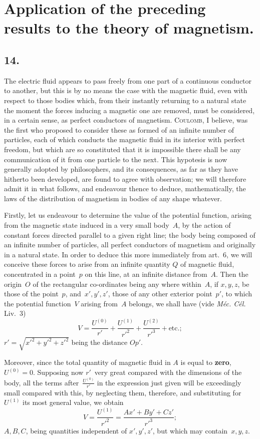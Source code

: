 \documentclass[11pt,notitlepage]{amsart}
\let\Person\textsc
\let\Emphasis\textbf
\let\Title\textit
\newcommand\Section[1]{\subsection{{#1}}}
\begin{document}
\section{Application of the preceding results to the theory of magnetism.}
\Section{14.}
The electric fluid appears to pass freely from one part of a continuous
conductor to another, but this is by no means the case with the magnetic
fluid, even with respect to those bodies which, from their instantly returning
to a natural state the moment the forces inducing a magnetic one are removed,
must be considered, in a certain sense, as perfect conductors of magnetism.
\Person{Coulomb}, I believe,
was the first who proposed to consider these as formed
of an infinite number of particles, each of which conducts the magnetic fluid
in its interior with perfect freedom, but which are so constituted that it is
impossible there shall be any communication of it from one particle to the
next. This hypotesis is now generally adopted by philosophers, and its 
consequences, as far as they have hitherto been developed, are found to agree
with observation; we will therefore admit it in what follows, and endeavour
thence to deduce, mathematically, the laws of the distribution of magnetism
in bodies of any shape whatever.

Firstly, let us endeavour to determine the value of the potential
function, arising from the magnetic state induced in a very small body~$A$, by
the action of constant forces directed parallel to a given right line; the body
being composed of an infinite number of particles, all perfect conductors of
magnetism and originally in a natural state. In order to deduce this more
immediately from art.~6, we will conceive these forces to arise from an 
infinite quantity $Q$ of magnetic fluid, concentrated
in a point~$p$ on this line, at
an infinite distance from~$A$. Then the origin~$O$ of the rectangular
co-ordinates being any where within~$A$, if $x,y,z$,
be those of the point~$p$, and~$x',y',z'$,
those of any other exterior point~$p'$, to which the potential
function~$V$ arising from~$A$ belongs, we shall have
(vide \Title{M\'ec. C\'el.} Liv.~3)
\[
V=\frac{U^{(0)}}{r'}
+\frac{U^{(1)}}{r'^2}
+\frac{U^{(2)}}{r'^3}
+\text{etc.};
\]
$r'=\sqrt{x'^2+y'^2+z'^2}$ being the distance $Op'$.

Moreover, since the total quantity of magnetic fluid in $A$ is equal to
\Emphasis{zero}, ${U^{(0)}=0}$.
Supposing now $r'$~very great compared with the dimensions of
the body, all the terms after~$\frac{U^{(0)}}{r'}$
in the expression just given will be exceedingly
small compared with this, by neglecting them, therefore, and substituting
for~$U^{(1)}$ its most general value, we obtain
\[
V=\frac{U^{(1)}}{r'^2}
=\frac{Ax'+By'+Cz'}{r'^3};
\]
$A,B,C$, being quantities independent of $x',y',z'$,
but which may contain~$x,y,z$.
\end{document}
